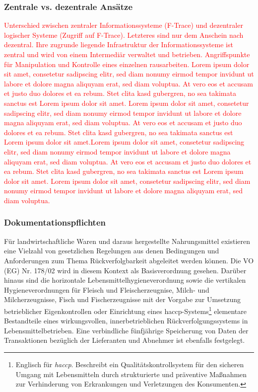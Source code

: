 \subsubsection{Zentrale vs. dezentrale Ansätze}
\textcolor{red}{Unterschied zwischen zentraler Informationssysteme (F-Trace) und dezentraler logischer Systeme (Zugriff auf F-Trace). Letzteres sind nur dem Anschein nach dezentral. Ihre zugrunde liegende Infrastruktur der Informationssysteme ist zentral und wird von einem Intermediär verwaltet und betrieben. Angriffspunkte für Manipulation und Kontrolle eines einzelnen rausarbeiten. \citep{Steins2015, allgemeinefleischerzeitung2011}
Lorem ipsum dolor sit amet, consetetur sadipscing elitr, sed diam nonumy eirmod tempor invidunt ut labore et dolore magna aliquyam erat, sed diam voluptua. At vero eos et accusam et justo duo dolores et ea rebum. Stet clita kasd gubergren, no sea takimata sanctus est Lorem ipsum dolor sit amet. Lorem ipsum dolor sit amet, consetetur sadipscing elitr, sed diam nonumy eirmod tempor invidunt ut labore et dolore magna aliquyam erat, sed diam voluptua. At vero eos et accusam et justo duo dolores et ea rebum. Stet clita kasd gubergren, no sea takimata sanctus est Lorem ipsum dolor sit amet.Lorem ipsum dolor sit amet, consetetur sadipscing elitr, sed diam nonumy eirmod tempor invidunt ut labore et dolore magna aliquyam erat, sed diam voluptua. At vero eos et accusam et justo duo dolores et ea rebum. Stet clita kasd gubergren, no sea takimata sanctus est Lorem ipsum dolor sit amet. Lorem ipsum dolor sit amet, consetetur sadipscing elitr, sed diam nonumy eirmod tempor invidunt ut labore et dolore magna aliquyam erat, sed diam voluptua.}

\subsubsection{Dokumentationspflichten}
Für landwirtschaftliche Waren und daraus hergestellte Nahrungsmittel existieren eine Vielzahl von gesetzlichen Regelungen aus denen Bedingungen und Anforderungen zum Thema Rückverfolgbarkeit abgeleitet werden können. Die VO (EG) Nr. 178/02 \citep{EPER2002} wird in diesem Kontext als Basisverordnung gesehen. Darüber hinaus sind die horizontale Lebensmittelhygieneverordnung sowie die vertikalen Hygieneverordnungen für Fleisch und Fleischerzeugnise, Milch- und Milcherzeugnisse, Fisch und Fischerzeugnisse mit der Vorgabe zur Umsetzung betrieblicher Eigenkontrollen oder Einrichtung eines \acs{haccp}-Systems\footnote{Englisch für \textit{\acf{haccp}}. Beschreibt ein Qualitätskontrollsystem für den sicheren Umgang mit Lebensmitteln durch strukturierte und präventive Maßnahmen zur Verhinderung von Erkrankungen und Verletzungen des Konsumenten.\citep{EPER2004}} elementare Bestandteile eines wirkungsvollen, innerbetrieblichen Rückverfolgungssystems in Lebensmittelbetrieben. Eine verbindliche fünfjährige Speicherung von Daten der Transaktionen bezüglich der Lieferanten und Abnehmer ist ebenfalls festgelegt.\\


